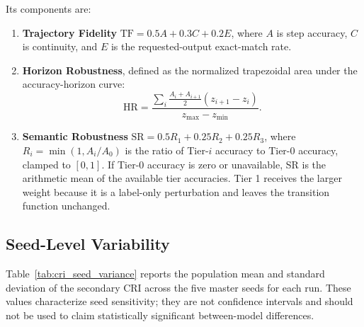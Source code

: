 \documentclass{article}
\begin{document}
Its components are:
\begin{enumerate}
    \item \textbf{Trajectory Fidelity}
    $\text{TF} = 0.5A + 0.3C + 0.2E$,
    where $A$ is step accuracy, $C$ is continuity, and $E$ is the requested-output exact-match rate.

    \item \textbf{Horizon Robustness}, defined as the normalized trapezoidal area under the accuracy-horizon curve:
    \[
    \text{HR} =
    \frac{
    \displaystyle\sum_i
    \frac{A_i+A_{i+1}}{2}
    (z_{i+1}-z_i)
    }{
    z_{\max}-z_{\min}
    }.
    \]

    \item \textbf{Semantic Robustness}
    $\text{SR} = 0.5R_1 + 0.25R_2 + 0.25R_3$,
    where $R_i=\min(1,A_i/A_0)$ is the ratio of Tier-$i$ accuracy to Tier-0 accuracy, clamped to $[0,1]$. If Tier-0 accuracy is zero or unavailable, SR is the arithmetic mean of the available tier accuracies. Tier 1 receives the larger weight because it is a label-only perturbation and leaves the transition function unchanged.
\end{enumerate}

\subsection{Seed-Level Variability}
\label{app:seed_variance}
Table~\ref{tab:cri_seed_variance} reports the population mean and standard
deviation of the secondary CRI across the five master seeds for each
run. These values characterize seed sensitivity; they are not
confidence intervals and should not be used to claim statistically significant
between-model differences.
\end{document}
